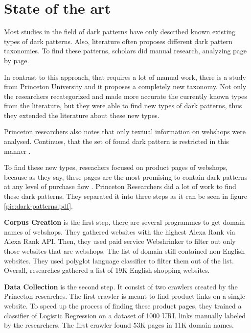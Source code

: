 \chapter{State of the art}
Most studies \cite{dark-patterns-brignull} \cite{dark-patterns-colin} \cite{taxonomies-conti} in the field of dark patterns have only described known existing types of dark patterns. Also, literature often proposes different dark pattern taxonomies. To find these patterns, scholars did manual research, analyzing page by page.

In contrast to this approach, that requires a lot of manual work, there is a study from Princeton University \cite{dark-patterns-at-scale} and it proposes a completely new taxonomy. Not only the researchers recategorized and made more accurate the currently known types from the literature, but they were able to find new types of dark patterns, thus they extended the literature about these new types.

Princeton researchers also notes that only textual information on webshops were analysed. Continues, that the set of found dark pattern is restricted in this manner \cite{dark-patterns-at-scale}.

To find these new types, reseachers focused on product pages of webshops, because as they say, these pages are the most promising to contain dark patterns at any level of purchase flow \cite{dark-patterns-at-scale}. Princeton Researchers did a lot of work to find these dark patterns. They separated it into three steps as it can be seen in figure \ref{pic:dark-patterns.pdf}.


\textbf{Corpus Creation} is the first step, there are several programmes to get domain names of webshops. They gathered websites with the highest Alexa Rank via Alexa Rank API. Then, they used paid service Webshrinker to filter out only those websites that are webshops. The list of domain still contained non-English websites. They used polyglot language classifier to filter them out of the list. Overall, researches gathered a list of 19K English shopping websites\cite{dark-patterns-at-scale}.

\textbf{Data Collection} is the second step. It consist of two crawlers created by the Princeton researches. The first crawler is meant to find product links on a single website. To speed up the process of finding these product pages, they trained a classifier of Logistic Regression on a dataset of 1000 URL links manually labeled by the researchers. The first crawler found 53K pages in 11K domain names.

